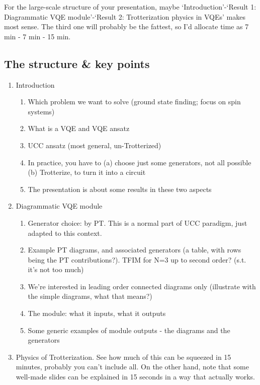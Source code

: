 \documentclass[10pt, a4paper]{article}
\begin{document}
For the large-scale structure of your presentation, maybe `Introduction'-`Result 1: Diagrammatic VQE module'-`Result 2: Trotterization physics in VQEs' makes most sense. The third one will probably be the fattest, so I'd allocate time as 7 min - 7 min - 15 min. 

\subsection*{The structure \& key points}

\begin{enumerate}
\item Introduction
\begin{enumerate}
	\item Which problem we want to solve (ground state finding; focus on spin systems)
	\item What is a VQE and VQE ansatz
	\item UCC ansatz (most general, un-Trotterized)
	\item In practice, you have to (a) choose just some generators, not all possible (b) Trotterize, to turn it into a circuit
	\item The presentation is about some results in these two aspects
\end{enumerate}

\item Diagrammatic VQE module

\begin{enumerate}
	\item Generator choice: by PT. This is a normal part of UCC paradigm, just adapted to this context.
	\item Example PT diagrams, and associated generators (a table, with rows being the PT contributions?). TFIM for N=3 up to second order? (s.t. it's not too much)
	\item We're interested in leading order connected diagrams only (illustrate with the simple diagrams, what that means?)
	\item The module: what it inputs, what it outputs
	\item Some generic examples of module outputs - the diagrams and the generators
\end{enumerate}

\item Physics of Trotterization. See how much of this can be squeezed in 15 minutes, probably you can't include all. On the other hand, note that some well-made slides can be explained in 15 seconds in a way that actually works.


\end{enumerate}
\end{document}
